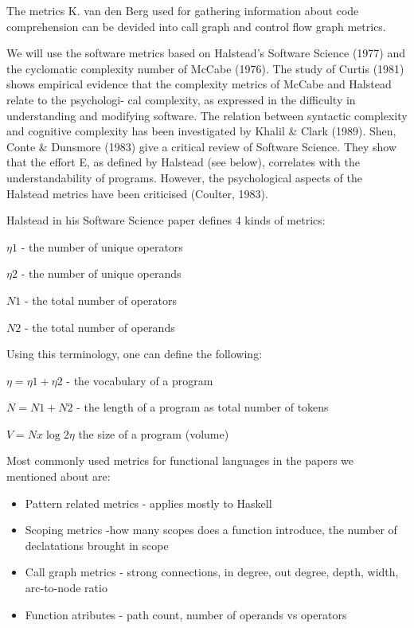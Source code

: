 \documentclass{article}
\begin{document}
The metrics K. van den Berg used for gathering information about code comprehension can be devided into call graph and control flow graph metrics.

We will use the software metrics based on Halstead's Software Science (1977) and the cyclomatic complexity number of McCabe (1976). The study of Curtis (1981) shows empirical evidence that the complexity metrics of McCabe and Halstead relate to the psychologi- cal complexity, as expressed in the difficulty in understanding and modifying software. The relation between syntactic complexity and cognitive complexity has been investigated by Khalil \& Clark (1989). Shen, Conte \& Dunsmore (1983) give a critical review of Software Science. They show that the effort E, as defined by Halstead (see below), correlates with the understandability of programs. However, the psychological aspects of the Halstead metrics have been criticised (Coulter, 1983). \cite{DBLP:journals/infsof/BergB95}

Halstead in his Software Science paper defines 4 kinds of metrics: 

\begin{center}
$\eta1$ - the number of unique operators \par
$\eta2$ - the number of unique operands \par
$N1$ - the total number of operators \par
$N2$ - the total number of operands \par
\end{center}

Using this terminology, one can define the following:\par
\begin{center}
$\eta = \eta1 + \eta2 $ - the vocabulary of a program \par
$N = N1 + N2 $ - the length of a program as total number of tokens \par
$V = N x \log2 \eta $ the size of a program (volume)
\end{center}


Most commonly used metrics for functional languages in the papers we mentioned about are:

\begin{itemize}
\item Pattern related metrics - applies mostly to Haskell
\item Scoping metrics -how many scopes does a function introduce, the number of declatations brought in scope
\item Call graph metrics - strong connections, in degree, out degree, depth, width, arc-to-node ratio
\item Function atributes - path count, number of operands vs operators
\end{itemize}
\end{document}
